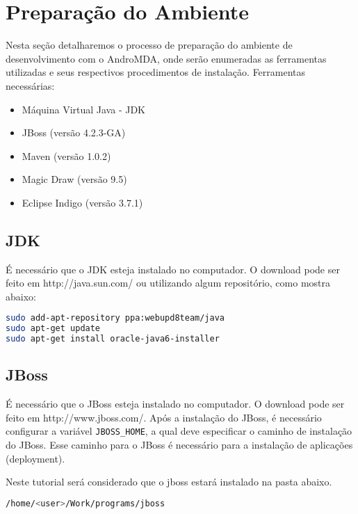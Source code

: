 \chapter{Preparação do Ambiente}

Nesta seção detalharemos o processo de preparação do ambiente de desenvolvimento com o AndroMDA, onde serão enumeradas as ferramentas utilizadas e seus respectivos procedimentos de instalação. 
Ferramentas necessárias:
\begin{itemize}
  \item Máquina Virtual Java - JDK
  \item JBoss (versão 4.2.3-GA)
  \item Maven (versão 1.0.2) 
  \item Magic Draw (versão 9.5)
  \item Eclipse Indigo (versão 3.7.1)
\end{itemize}

\section{JDK}

É necessário que o JDK esteja instalado no computador. O download pode ser feito em http://java.sun.com/ ou utilizando algum repositório, como mostra abaixo:

\begin{lstlisting}[language=bash]
sudo add-apt-repository ppa:webupd8team/java
sudo apt-get update
sudo apt-get install oracle-java6-installer
\end{lstlisting}

\section{JBoss}

É necessário que o JBoss esteja instalado no computador. O download pode ser feito em h\hypertarget{ttp://www.jboss.com/}{ttp://www.jboss.com/}. Após a instalação do JBoss, é necessário configurar a variável \texttt{JBOSS\_HOME}, a qual deve especificar o caminho de instalação do JBoss. Esse caminho para o JBoss é necessário para a instalação de aplicações (deployment).

Neste tutorial será considerado que o jboss estará instalado na pasta abaixo.

\begin{lstlisting}[language=bash]
/home/<user>/Work/programs/jboss
\end{lstlisting}

